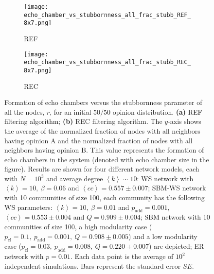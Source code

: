 \documentclass[11 pt , letterpaper , twoside , openright]{book}
\begin{document}
\begin{figure}[H]
  \begin{subfigure}[b]{0.49\textwidth}
    \caption{REF}
  	\texttt{[image: echo\_chamber\_vs\_stubbornness\_all\_frac\_stubb\_REF\_8x7.png]}
    \label{REF_all_frac_stubb}
  \end{subfigure}
  \begin{subfigure}[b]{0.49\textwidth}
    \caption{REC}
  	\texttt{[image: echo\_chamber\_vs\_stubbornness\_all\_frac\_stubb\_REC\_8x7.png]}
    \label{REC_all_frac_stubb}
  \end{subfigure}
  \captionsetup{format=plain}
  \caption[Formation of echo chambers versus the stubbornness parameter of all the nodes, $r$, for the REF and REC filtering algorithms and an initial $50/50$ opinion distribution.]{Formation of echo chambers versus the stubbornness parameter of all the nodes, $r$, for an initial $50/50$ opinion distribution. \textbf{(a)} REF filtering algorithm; \textbf{(b)} REC filtering algorithm. The $y$-axis shows the average of the normalized fraction of nodes with all neighbors having opinion A and the normalized fraction of nodes with all neighbors having opinion B. This value represents the formation of echo chambers in the system (denoted with echo chamber size in the figure). Results are shown for four different network models, each with $N=10^3$ and average degree $\left<k\right> \sim 10$: WS network with $\left<k\right> =10,\ \beta = 0.06$ and $\left<cc\right> = 0.557 \pm 0.007$; SBM-WS network with 10 communities of size 100, each community has the following WS parameters: $\left<k\right> = 10,\ \beta = 0.01$ and $p_{\text{add}} = 0.001$, $\left<cc\right> = 0.553 \pm 0.004$ and $Q = 0.909 \pm 0.004$; SBM network with 10 communities of size 100, a high modularity case ($p_{\text{cl}} = 0.1,\ p_{\text{add}} = 0.001,\ Q = 0.908 \pm 0.005$) and a low modularity case ($p_{\text{cl}} = 0.03,\ p_{\text{add}} = 0.008,\ Q = 0.220 \pm 0.007$) are depicted; ER network with $p= 0.01$. Each data point is the average of $10^2$ independent simulations. Bars represent the standard error $SE$.}
\label{echo_vs_all_frac_stubb_REF-REC}
\end{figure}
\noindent
\end{document}
